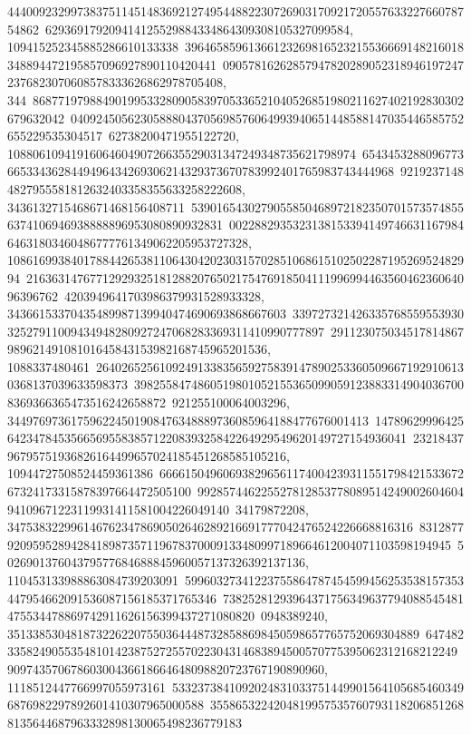 {{{44400923299738375114514836921274954488223072690317092172055763322766078754862\
629369179209414125529884334864309308105327099584, 109415252345885286610133338\
39646585961366123269816523215536669148216018348894472195857096927890110420441\
090578162628579478202890523189461972472376823070608578333626862978705408, 344\
86877197988490199533280905839705336521040526851980211627402192830302679632042\
04092450562305888043705698576064993940651448588147035446585752655229535304517\
62738200471955122720, 1088061094191606460490726635529031347249348735621798974\
65434532880967736653343628449496434269306214329373670783992401765983743444968\
92192371484827955581812632403358355633258222608, 3436132715468671468156408711\
53901654302790558504689721823507015735748556374106946938888896953080890932831\
002288293532313815339414974663116798464631803460486777761349062205953727328, 
   10861699384017884426538110643042023031570285106861510250228719526952482994\
21636314767712929325181288207650217547691850411199699446356046236064096396762\
4203949641703986379931528933328, 34366153370435489987139940474690693868667603\
33972732142633576855955393032527911009434948280927247068283369311410990777897\
29112307503451781486798962149108101645843153982168745965201536, 1088337480461\
26402652561092491338356592758391478902533605096671929106130368137039633598373\
39825584748605198010521553650990591238833149040367008369366365473516242658872\
921255100064003296, 344976973617596224501908476348889736085964188477676001413\
14789629996425642347845356656955838571220839325842264929549620149727154936041\
2321843796795751936826164499657024185451268585105216, 10944727508524459361386\
66661504960693829656117400423931155179842153367267324173315878397664472505100\
99285744622552781285377808951424900260460494109671223119931411581004226049140\
34179872208, 3475383229961467623478690502646289216691777042476524226668816316\
83128779209595289428418987357119678370009133480997189664612004071103598194945\
502690137604379577684688845960057137326392137136, 110453133988863084739203091\
59960327341223755864787454599456253538157353447954662091536087156185371765346\
73825281293964371756349637794088545481475534478869742911626156399437271080820\
0948389240, 35133853048187322622075503644487328588698450598657765752069304889\
64748233582490553548101423875272557022304314683894500570775395062312168212249\
90974357067860300436618664648098820723767190890960, 1118512447766997055973161\
53323738410920248310337514499015641056854603496876982297892601410307965000588\
35586532242048199575357607931182068512688135644687963332898130065498236779183\
}}}
